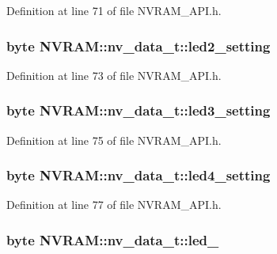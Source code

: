 Definition at line 71 of file N\-V\-R\-A\-M\-\_\-\-A\-P\-I.\-h.

\hypertarget{struct_n_v_r_a_m_1_1nv__data__t_aeed970dbf67dc4d1de4424cc78747d2a}{
\subsubsection[{led2\-\_\-setting}]{\setlength{\rightskip}{0pt plus 5cm}byte N\-V\-R\-A\-M\-::nv\-\_\-data\-\_\-t\-::led2\-\_\-setting}}\label{struct_n_v_r_a_m_1_1nv__data__t_aeed970dbf67dc4d1de4424cc78747d2a}


Definition at line 73 of file N\-V\-R\-A\-M\-\_\-\-A\-P\-I.\-h.

\hypertarget{struct_n_v_r_a_m_1_1nv__data__t_af3ed0f3ac41ee1c76acf247be0db43cf}{
\subsubsection[{led3\-\_\-setting}]{\setlength{\rightskip}{0pt plus 5cm}byte N\-V\-R\-A\-M\-::nv\-\_\-data\-\_\-t\-::led3\-\_\-setting}}\label{struct_n_v_r_a_m_1_1nv__data__t_af3ed0f3ac41ee1c76acf247be0db43cf}


Definition at line 75 of file N\-V\-R\-A\-M\-\_\-\-A\-P\-I.\-h.

\hypertarget{struct_n_v_r_a_m_1_1nv__data__t_a2e28d27bfb09a3b9c37e44df93fc136f}{
\subsubsection[{led4\-\_\-setting}]{\setlength{\rightskip}{0pt plus 5cm}byte N\-V\-R\-A\-M\-::nv\-\_\-data\-\_\-t\-::led4\-\_\-setting}}\label{struct_n_v_r_a_m_1_1nv__data__t_a2e28d27bfb09a3b9c37e44df93fc136f}


Definition at line 77 of file N\-V\-R\-A\-M\-\_\-\-A\-P\-I.\-h.

\hypertarget{struct_n_v_r_a_m_1_1nv__data__t_a3cc4dbc901e8c3659495774eaa851e63}{
\subsubsection[{led\-\_\-1}]{\setlength{\rightskip}{0pt plus 5cm}byte N\-V\-R\-A\-M\-::nv\-\_\-data\-\_\-t\-::led\-\_}}\label{struct_n_v_r_a_m_1_1nv__data__t_a3cc4dbc901e8c3659495774eaa851e63}


